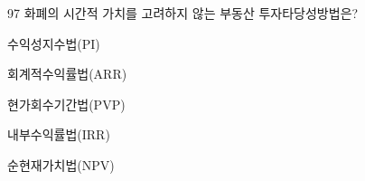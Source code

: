 \begin{question}{97}
화폐의 시간적 가치를 고려하지 않는 부동산 투자타당성방법은?
\begin{choices}
  \item 수익성지수법(PI)
  \item 회계적수익률법(ARR)
  \item 현가회수기간법(PVP)
  \item 내부수익률법(IRR)
  \item 순현재가치법(NPV)
\end{choices}
\end{question}
